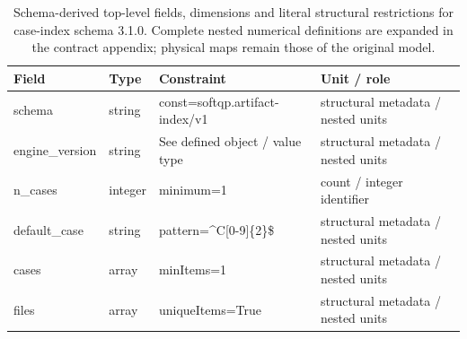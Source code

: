 \begin{table}[htbp]\centering\footnotesize
\caption{Schema-derived top-level fields, dimensions and literal structural restrictions for case-index schema 3.1.0. Complete nested numerical definitions are expanded in the contract appendix; physical maps remain those of the original model.}\label{tab:contract-case-index}
\begin{tabularx}{\textwidth}{@{}>{\raggedright\arraybackslash}p{}>{\raggedright\arraybackslash}p{}>{\raggedright\arraybackslash}X>{\raggedright\arraybackslash}X@{}}\toprule
Field & Type & Constraint & Unit / role\\\midrule
schema & string & const=\allowbreak{}softqp.\allowbreak{}artifact-\allowbreak{}index/\allowbreak{}v1 & structural metadata /\allowbreak{} nested units\\
engine\_\allowbreak{}version & string & See defined object /\allowbreak{} value type & structural metadata /\allowbreak{} nested units\\
n\_\allowbreak{}cases & integer & minimum=\allowbreak{}1 & count /\allowbreak{} integer identifier\\
default\_\allowbreak{}case & string & pattern=\allowbreak{}\textasciicircum{}C[0-9]\{2\}\$ & structural metadata /\allowbreak{} nested units\\
cases & array & minItems=\allowbreak{}1 & structural metadata /\allowbreak{} nested units\\
files & array & uniqueItems=\allowbreak{}True & structural metadata /\allowbreak{} nested units\\
\bottomrule\end{tabularx}
\end{table}
